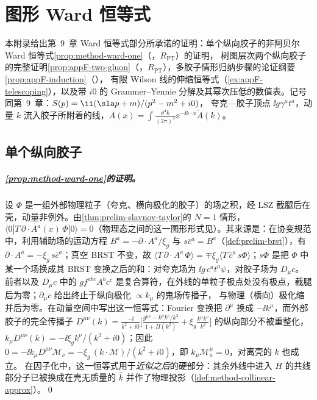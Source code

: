 \chapter{图形 Ward 恒等式}\label{app:appF}

本附录给出第~9~章 Ward 恒等式部分所承诺的证明：单个纵向胶子的非阿贝尔 Ward 恒等式\cref{prop:method-ward-one}（\tagR，$R_{\mathrm{PT}}$）的证明，
树图层次两个纵向胶子的完整证明\cref{prop:appF-two-gluon}（\tagR，$R_{\mathrm{PT}}$），多胶子情形归纳步骤的论证纲要\cref{prop:appF-induction}（\tagA），
有限 Wilson 线的伸缩恒等式（\cref{ex:appF-telescoping}），以及带 $i0$ 的 Grammer--Yennie 分解及其幂次压低的数值表。记号同第~9~章：$S(p)=\ii(\sla p+m)/(p^2-m^2+i0)$，
夸克—胶子顶点 $\ii g\gamma^\mu t^a$，动量 $k$ 流入胶子所附着的线，$A(x)=\int\frac{\dd^4k}{(2\pi)^4}\ee^{-\ii k\cdot x}\tilde A(k)$。

\section{单个纵向胶子}\label{sec:appF-one}

\paragraph{\cref{prop:method-ward-one}的证明。}
设 $\Phi$ 是一组外部物理粒子（夸克、横向极化的胶子）的场之积，经 LSZ 截腿后在壳，动量非例外。由\cref{thm:prelim-slavnov-taylor}的 $N=1$ 情形，
$\langle0|T\,\partial\cdot A^a(x)\,\Phi|0\rangle=0$（物理态之间的这一图形形式见\cite[第~8.2~节，式~(131)]{CollinsSoperSterman1989}）。其来源是：在协变规范中，利用辅助场的运动方程 $B^a=-\partial\cdot A^a/\xi_g$ 与 $s\bar c^a=B^a$（\cref{def:prelim-brst}），有 $\partial\cdot A^a=-\xi_g\,s\bar c^a$；真空 BRST 不变，故
$\langle T\,\partial\cdot A^a\,\Phi\rangle=\mp\xi_g\langle T\,\bar c^a\,s\Phi\rangle$；$s\Phi$ 是把 $\Phi$ 中某一个场换成其 BRST 变换之后的和：对夸克场为 $\ii g\,c^at^a\psi$，对胶子场为 $D_\mu c$。
前者以及 $D_\mu c$ 中的 $gf^{abc}A^bc^c$ 是复合算符，在外线的单粒子极点处没有极点，截腿后为零；$\partial_\mu c$ 给出终止于纵向极化 $\propto k_\mu$ 的鬼场传播子，
与物理（横向）极化缩并后为零。在动量空间中写出这一恒等式：Fourier 变换把 $\partial^\mu$ 换成 $-\ii k^\mu$，而外部胶子的完全传播子
$D^{\mu\nu}(k)=\frac{-\ii}{k^2+i0}\bigl[\frac{g^{\mu\nu}-k^\mu k^\nu/k^2}{1+\Pi(k^2)}+\xi_g\frac{k^\mu k^\nu}{k^2}\bigr]$ 的纵向部分不被重整化，
$k_\mu D^{\mu\nu}(k)=-\ii\xi_gk^\nu/(k^2+i0)$；因此 $0=-\ii k_\mu D^{\mu\nu}\mathcal M_\nu=-\xi_g\,(k\cdot\mathcal M)/(k^2+i0)$，即 $k_\mu\mathcal M^\mu_a=0$，对离壳的 $k$ 也成立。
在因子化中，这一恒等式用于\emph{近似之后}的硬部分：其余外线中进入 $H$ 的共线部分子已被换成在壳无质量的 $\hat k$ 并作了物理投影（\cref{def:method-collinear-approx}）。\qed

